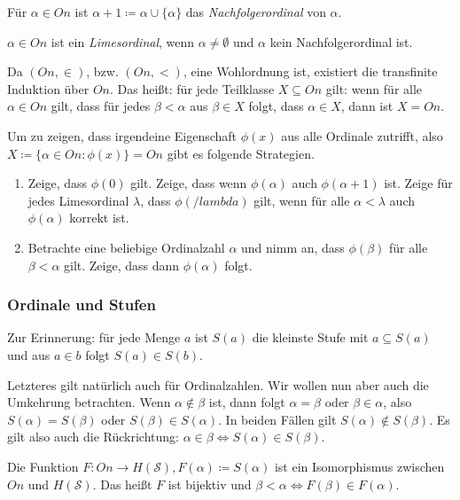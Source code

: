 \begin{definition}[Nachfolgerordinal]
	Für $\alpha\in On$ ist $\alpha+1\coloneqq\alpha\cup \{\alpha\}$ das \textit{Nachfolgerordinal} von $\alpha$.
\end{definition}

\begin{definition}[Limesordinal]
	$\alpha\in On$ ist ein \textit{Limesordinal}, wenn $\alpha\neq\emptyset$ und $\alpha$ kein Nachfolgerordinal ist.
\end{definition}

Da $(On,\in)$, bzw. $(On,<)$, eine Wohlordnung ist, existiert die transfinite Induktion über $On$. Das heißt: für jede Teilklasse $X\subseteq On$ gilt: wenn für alle $\alpha\in On$ gilt, dass für jedes $\beta<\alpha$ aus $\beta\in X$ folgt, dass $\alpha\in X$, dann ist $X=On$.

Um zu zeigen, dass irgendeine Eigenschaft $\phi(x)$ aus alle Ordinale zutrifft, also $X\coloneqq\{\alpha\in On : \phi(x)\}=On$ gibt es folgende Strategien.
\begin{enumerate}
	\item Zeige, dass $\phi(0)$ gilt. Zeige, dass wenn $\phi(\alpha)$ auch $\phi(\alpha+1)$ ist. Zeige für jedes Limesordinal $\lambda$, dass $\phi(/lambda)$ gilt, wenn für alle $\alpha<\lambda$ auch $\phi(\alpha)$ korrekt ist.
	
	\item Betrachte eine beliebige Ordinalzahl $\alpha$ und nimm an, dass $\phi(\beta)$ für alle $\beta<\alpha$ gilt. Zeige, dass dann $\phi(\alpha)$ folgt.
\end{enumerate}

\subsubsection{Ordinale und Stufen}

Zur Erinnerung: für jede Menge $a$ ist $S(a)$ die kleinste Stufe mit $a\subseteq S(a)$ und aus $a\in b$ folgt $S(a)\in S(b)$.

Letzteres gilt natürlich auch für Ordinalzahlen. Wir wollen nun aber auch die Umkehrung betrachten. Wenn $\alpha\notin\beta$ ist, dann folgt $\alpha=\beta$ oder $\beta\in\alpha$, also $S(\alpha)=S(\beta)$ oder $S(\beta)\in S(\alpha)$. In beiden Fällen gilt $S(\alpha)\notin S(\beta)$. Es gilt also auch die Rückrichtung: $\alpha\in\beta \Leftrightarrow S(\alpha)\in S(\beta)$.

\begin{satz}
	Die Funktion $F:On \to H(\mathcal{S}), F(\alpha)\coloneqq S(\alpha)$ ist ein Isomorphismus zwischen $On$ und $H(\mathcal{S})$. Das heißt $F$ ist bijektiv und $\beta<\alpha \Leftrightarrow F(\beta)\in F(\alpha)$.
\end{satz}

